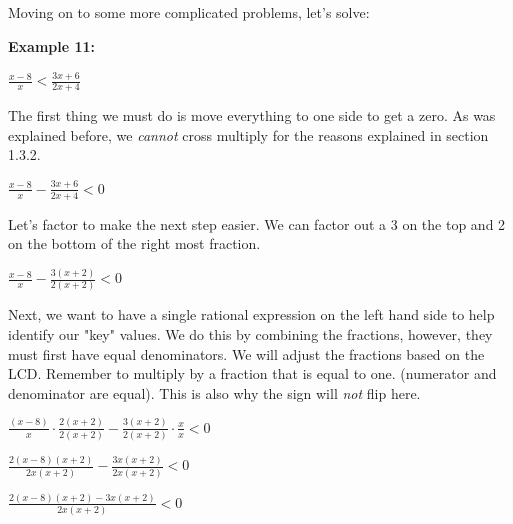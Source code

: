 \documentclass[12pt,fleqn]{book} %
\begin{document}
Moving on to some more complicated problems, let's solve:

\noindent\textbf{Example 11:}

\vspace*{-5mm}

\begin{center}
    \LARGE{$\frac{x-8}{x} < \frac{3x+6}{2x+4}$}
\end{center}

\noindent The first thing we must do is move everything to one side to get a zero. As was explained before, we \emph{cannot} cross multiply for the reasons explained in section 1.3.2.

\vspace*{-4mm}

\begin{center}
    \LARGE{$\frac{x-8}{x} - \frac{3x+6}{2x+4} < 0$}
\end{center}

\noindent Let's factor to make the next step easier. We can factor out a 3 on the top and 2 on the bottom of the right most fraction. 

\vspace*{-4mm}

\begin{center}
    \LARGE{$\frac{x-8}{x} - \frac{3(x+2)}{2(x+2)} < 0$}
\end{center}

\noindent Next, we want to have a single rational expression on the left hand side to help identify our "key" values. We do this by combining the fractions, however, they must first have equal denominators. We will adjust the fractions based on the LCD. Remember to multiply by a fraction that is equal to one. (numerator and denominator are equal). This is also why the sign will \emph{not} flip here.

\vspace*{-4mm}

\begin{center}
    \LARGE{$\frac{(x-8)}{x} \cdot \frac{2(x+2)}{2(x+2)} - \frac{3(x+2)}{2(x+2)} \cdot \frac{x}{x} < 0$}
\end{center}

\begin{center}
    \LARGE{$\frac{2(x-8)(x+2)}{2x(x+2)} - \frac{3x(x+2)}{2x(x+2)} < 0$}
\end{center}

\pagebreak

\begin{center}
    \LARGE{$\frac{2(x-8)(x+2)-3x(x+2)}{2x(x+2)} < 0$}
\end{center}
\end{document}

